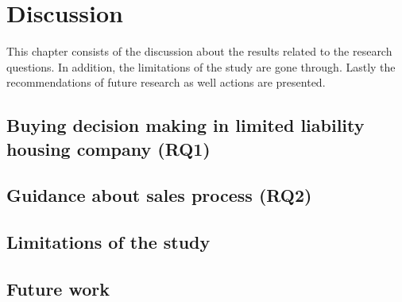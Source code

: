 \chapter{Discussion}
\label{chapter:discussion}

This chapter consists of the discussion about the results related to the research questions. In addition, the limitations of the study are gone through. Lastly the recommendations of future research as well actions are presented.

\section{Buying decision making in limited liability housing company (RQ1)}

\section{Guidance about sales process (RQ2)}

\section{Limitations of the study}

\section{Future work}